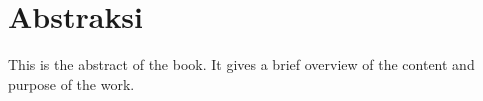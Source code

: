 \chapter*{Abstraksi}

\vspace*{-1\baselineskip}

\begin{singlespace}
  This is the abstract of the book.
  It gives a brief overview of the content and purpose of the work.

\end{singlespace}